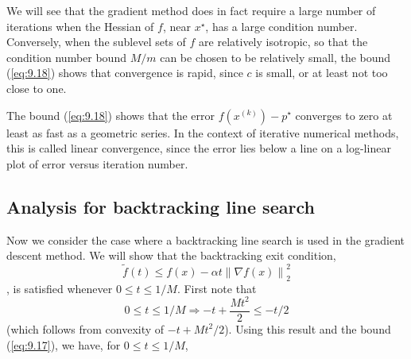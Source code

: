 \documentclass{acm_proc_article-sp}
\begin{document}
We will see that the gradient method does in fact require a large number of iterations when the Hessian of $f$, 
near $x^{⋆}$, has a large condition number. 
Conversely, when the sublevel sets of $f$ are relatively isotropic, 
so that the condition number bound $M/m$ can be chosen to be relatively small, 
the bound (\ref{eq:9.18}) shows that convergence is rapid, 
since $c$ is small, or at least not too close to one.

The bound (\ref{eq:9.18}) shows that the error $f(x^{(k)})−p^{⋆}$ converges to zero at least as fast as a geometric series. 
In the context of iterative numerical methods, this is called linear convergence, 
since the error lies below a line on a log-linear plot of error versus iteration number.

\subsection{Analysis for backtracking line search}
Now we consider the case where a backtracking line search is used in the gradient descent method. 
We will show that the backtracking exit condition,
$$\widetilde{f}(t)\leq f(x)−\alpha t\left\| \nabla f\left( x\right) \right\| _{2}^{2}$$, 
is satisfied whenever $0 \leq t \leq 1/M$. 
First note that
$$0 \leq t \leq 1/M \Rightarrow −t+\dfrac{Mt^{2}}{2} \leq −t/2$$
(which follows from convexity of $−t+Mt^{2}/2$). Using this result and the bound (\ref{eq:9.17}),
we have, for $0 \leq t \leq 1/M$,
\end{document}
